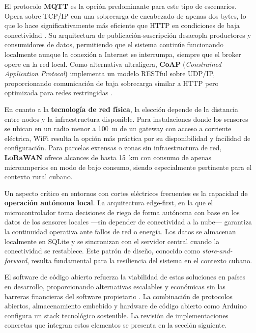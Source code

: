 El protocolo \textbf{MQTT} es la opción predominante para este tipo de escenarios. Opera sobre TCP/IP con una sobrecarga de encabezado de apenas dos bytes, lo que lo hace significativamente más eficiente que HTTP en condiciones de baja conectividad \citep{tian2024novel}. Su arquitectura de publicación-suscripción desacopla productores y consumidores de datos, permitiendo que el sistema continúe funcionando localmente aunque la conexión a Internet se interrumpa, siempre que el broker opere en la red local. Como alternativa ultraligera, \textbf{CoAP} (\emph{Constrained Application Protocol}) implementa un modelo RESTful sobre UDP/IP, proporcionando comunicación de baja sobrecarga similar a HTTP pero optimizada para redes restringidas \citep{rfc7252}.

En cuanto a la \textbf{tecnología de red física}, la elección depende de la distancia entre nodos y la infraestructura disponible. Para instalaciones donde los sensores se ubican en un radio menor a 100~m de un gateway con acceso a corriente eléctrica, WiFi resulta la opción más práctica por su disponibilidad y facilidad de configuración. Para parcelas extensas o zonas sin infraestructura de red, \textbf{LoRaWAN} ofrece alcances de hasta 15~km con consumo de apenas microamperios en modo de bajo consumo, siendo especialmente pertinente para el contexto rural cubano.

Un aspecto crítico en entornos con cortes eléctricos frecuentes es la capacidad de \textbf{operación autónoma local}. La arquitectura edge-first, en la que el microcontrolador toma decisiones de riego de forma autónoma con base en los datos de los sensores locales ---sin depender de conectividad a la nube--- garantiza la continuidad operativa ante fallos de red o energía. Los datos se almacenan localmente en SQLite y se sincronizan con el servidor central cuando la conectividad se restablece. Este patrón de diseño, conocido como \emph{store-and-forward}, resulta fundamental para la resiliencia del sistema en el contexto cubano.

El software de código abierto refuerza la viabilidad de estas soluciones en países en desarrollo, proporcionando alternativas escalables y económicas sin las barreras financieras del software propietario \citep{livingopensource2024impact}. La combinación de protocolos abiertos, almacenamiento embebido y hardware de código abierto como Arduino configura un stack tecnológico sostenible. La revisión de implementaciones concretas que integran estos elementos se presenta en la sección siguiente.


